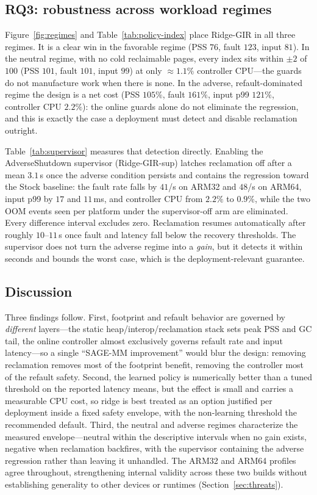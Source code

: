\subsection{RQ3: robustness across workload regimes}
\label{sec:rq3}
Figure~\ref{fig:regimes} and Table~\ref{tab:policy-index} place \textsf{Ridge-GIR}
in all three regimes. It is
a clear win in the favorable regime (PSS $76$, fault $123$, input $81$). In the
neutral regime, with no cold reclaimable pages, every index sits within $\pm2$ of
$100$ (PSS $101$, fault $101$, input $99$) at only $\approx1.1\%$ controller
CPU---the guards do not manufacture work when there is none. In the adverse,
refault-dominated regime the design is a net cost (PSS $105\%$, fault $161\%$,
input p99 $121\%$, controller CPU $2.2\%$): the online guards alone do not
eliminate the regression, and this is exactly the case a deployment must detect
and disable reclamation outright.

Table~\ref{tab:supervisor} measures that detection directly. Enabling the
AdverseShutdown supervisor (\textsf{Ridge-GIR-sup}) latches reclamation off after
a mean $3.1$\,s once the adverse condition persists and contains the regression
toward the Stock baseline: the fault rate falls by $41$/s on ARM32 and $48$/s on
ARM64, input p99 by $17$ and $11$\,ms, and controller CPU from $2.2\%$ to
$0.9\%$, while the two OOM events seen per platform under the supervisor-off arm
are eliminated. Every difference interval excludes zero. Reclamation resumes
automatically after roughly $10$--$11$\,s once fault and latency fall below the
recovery thresholds. The supervisor does not turn the adverse regime into a
\emph{gain}, but it detects it within seconds and bounds the worst case, which is
the deployment-relevant guarantee.



\subsection{Discussion}
\label{sec:discussion}
Three findings follow. First, footprint and refault behavior are governed by
\emph{different} layers---the static heap/interop/reclamation stack sets peak PSS
and GC tail, the online controller almost exclusively governs refault rate and
input latency---so a single ``SAGE-MM improvement'' would blur the design:
removing reclamation removes most of the footprint benefit, removing the
controller most of the refault safety. Second, the learned policy is numerically
better than a tuned threshold on the reported latency means, but the effect is
small and carries a measurable CPU cost, so ridge is best treated as an option
justified per deployment inside a fixed safety envelope, with the non-learning
threshold the recommended default. Third, the neutral and adverse regimes
characterize the measured envelope---neutral within the descriptive intervals
when no gain exists, negative when reclamation backfires, with the supervisor
containing the adverse regression rather than leaving it unhandled. The ARM32 and
ARM64 profiles agree throughout, strengthening internal validity across these two
builds without establishing generality to other devices or runtimes
(Section~\ref{sec:threats}).


